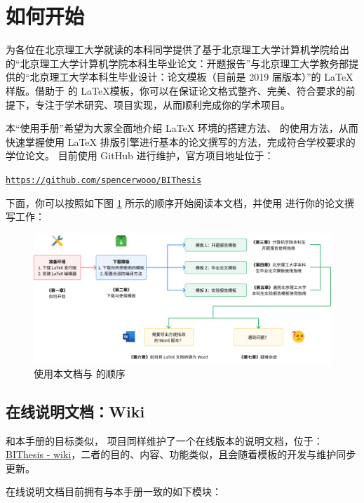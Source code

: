 \section{如何开始}
 {\BIThesis} 为各位在北京理工大学就读的本科同学提供了基于北京理工大学计算机学院给出的“北京理工大学计算机学院本科生毕业论文：开题报告”与北京理工大学教务部提供的“北京理工大学本科生毕业设计：论文模板（目前是 2019 届版本）”的 \LaTeX 样版。借助于 {\BIThesis} 的 \LaTeX 模板，你可以在保证论文格式整齐、完美、符合要求的前提下，专注于学术研究、项目实现，从而顺利完成你的学术项目。

本“使用手册”希望为大家全面地介绍 {\LaTeX} 环境的搭建方法、{\BIThesis} 的使用方法，从而快速掌握使用 {\LaTeX} 排版引擎进行基本的论文撰写的方法，完成符合学校要求的学位论文。{\BIThesis} 目前使用 GitHub 进行维护，官方项目地址位于：

\begin{center}
  \color{ForestGreen}\href{https://github.com/spencerwooo/BIThesis}{\texttt{https://github.com/spencerwooo/BIThesis}}
\end{center}

下面，你可以按照如下图 \ref{flowchart} 所示的顺序开始阅读本文档，并使用 {\BIThesis} 进行你的论文撰写工作：

\begin{figure}[H]
  \centering
  \includegraphics[width=\textwidth]{images/flowchart.png}
  \caption{使用本文档与 {\BIThesis} 的顺序}
  \label{flowchart}
\end{figure}

\subsection{在线说明文档：Wiki}
和本手册的目标类似，{\BIThesis} 项目同样维护了一个在线版本的说明文档，位于：{\href{https://bithesis.bitnp.net/}{BIThesis - wiki}}，二者的目的、内容、功能类似，且会随着模板的开发与维护同步更新。

{\BIThesis} 在线说明文档目前拥有与本手册一致的如下模块：

